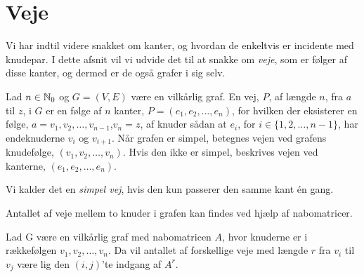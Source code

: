 \section{Veje}
Vi har indtil videre snakket om kanter, og hvordan de enkeltvis er incidente med knudepar. I dette afsnit vil vi udvide det til at snakke om \emph{veje}, som er følger af disse kanter, og dermed er de også grafer i sig selv. 

\begin{defn} [Veje] 
Lad $n \in \mathbb{N} _0$  og $G=(V,E)$ være en vilkårlig graf. En vej, $P$, af længde $n$, fra $a$ til $z$, i $G$ er en følge af $n$ kanter,  $ P= (e_{1},e_{2},\dotsc,e_{n})$, for hvilken der eksisterer en følge, $a=v_{1},v_{2},\dotsc,v_{n-1}$,$v_{n}=z$, af knuder sådan at $e_{i}$, for $i \in \{1,2,\dotsc,n-1 \}$, har endeknuderne $v_{i}$ og $v_{i+1}$. Når grafen er simpel, betegnes vejen ved grafens knudefølge, $(v_{1},v_{2},\dotsc,v_{n})$. Hvis den ikke er simpel, beskrives vejen ved kanterne, $(e_{1},e_{2},\dotsc,e_{n})$. 
\end{defn}
Vi kalder det en \emph{simpel vej}, hvis den kun passerer den samme kant én gang.



Antallet af veje mellem to knuder i grafen kan findes ved hjælp af nabomatricer.
\begin{thm}
Lad G være en vilkårlig graf med nabomatricen
\textbf{$A$}, hvor knuderne er i rækkefølgen $v_{1},v_{2},\dotsc,v_{n}$. Da vil antallet af forskellige veje med længde $r$ fra $v_{i}$ til $v_{j}$ være lig den $(i,j)$'te indgang af \textbf{$A^{r}$}.
\end{thm}

